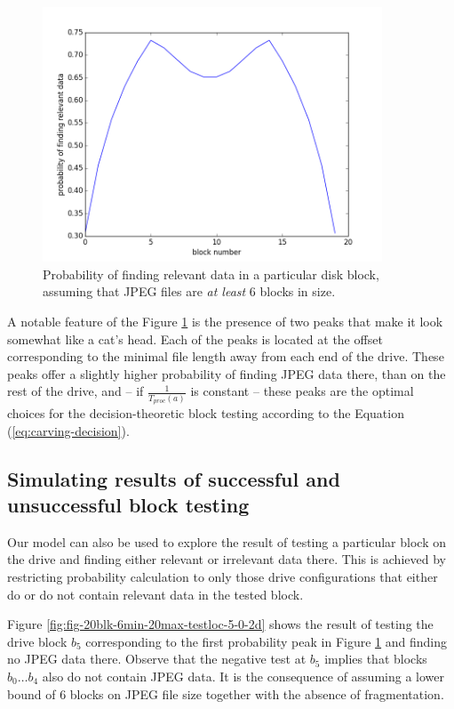 \documentclass[final,5p,times,twocolumn,authoryear]{elsarticle}
\begin{document}
\begin{figure}
  \centerline{\includegraphics[width=0.9\textwidth]{fig-20blk-6min-20max2d}}
  \caption{Probability of finding relevant data in a particular disk block, assuming that JPEG files are \emph{at least} 6 blocks in size.}
  \label{fig:fig-20blk-6min-20max2d}
\end{figure}

A notable feature of the Figure \ref{fig:fig-20blk-6min-20max2d} is the presence of two peaks that make it look somewhat like a cat's head. Each of the peaks is located at the offset corresponding to the minimal file length away from each end of the drive. These peaks offer a slightly higher probability of finding JPEG data there, than on the rest of the drive, and -- if $\frac{1}{T_{proc}(a)}$ is constant -- these peaks are the optimal choices for the decision-theoretic block testing according to the Equation (\ref{eq:carving-decision}).

\subsection{Simulating results of successful and unsuccessful block testing}

Our model can also be used to explore the result of testing a particular block on the drive and finding either relevant or irrelevant data there. This is achieved by restricting probability calculation to only those drive configurations that either do or do not contain relevant data in the tested block. 

Figure \ref{fig:fig-20blk-6min-20max-testloc-5-0-2d} shows the result of testing the drive block $b_5$ corresponding to the first probability peak in Figure \ref{fig:fig-20blk-6min-20max2d} and finding no JPEG data there. Observe that the negative test at $b_5$ implies that blocks $b_0 \dots b_4$ also do not contain JPEG data. It is the consequence of assuming a lower bound of 6 blocks on JPEG file size together with the absence of fragmentation. 
\end{document}
